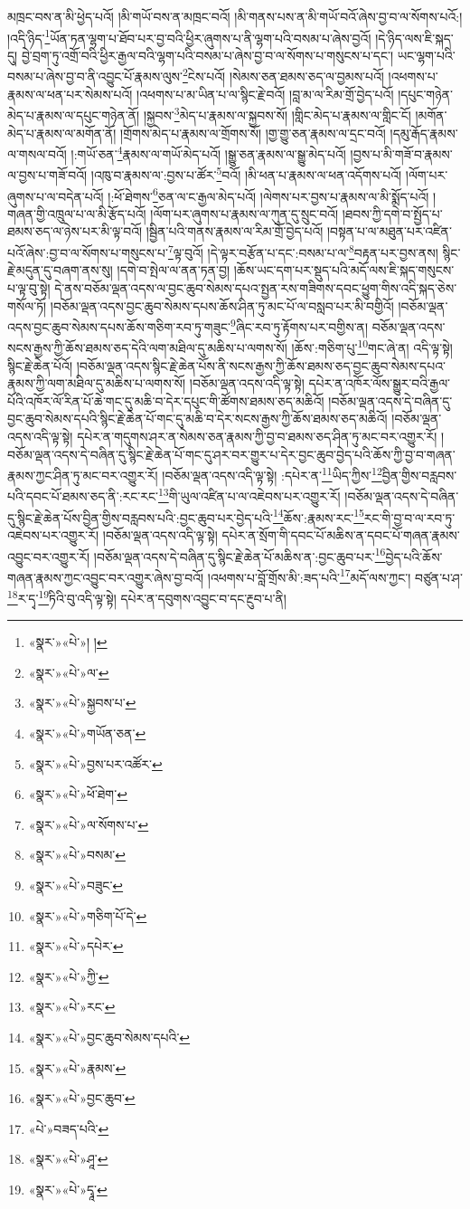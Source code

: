 མཁྲང་བས་ན་མི་ཕྱེད་པའོ། །མི་གཡོ་བས་ན་མཁྲང་བའོ། །མི་གནས་པས་ན་མི་གཡོ་བའོ་ཞེས་བྱ་བ་ལ་སོགས་པའོ:། །འདི་ཉིད་\footnote{«སྣར་»«པེ་»། །}ཡོན་ཏན་ལྷག་པ་ཐོབ་པར་བྱ་བའི་ཕྱིར་ཞུགས་པ་ནི་ལྷག་པའི་བསམ་པ་ཞེས་བྱའོ། །དེ་ཉིད་ལས་ཇི་སྐད་དུ། བྱེ་བྲག་ཏུ་འགྲོ་བའི་ཕྱིར་རྒྱལ་བའི་ལྷག་པའི་བསམ་པ་ཞེས་བྱ་བ་ལ་སོགས་པ་གསུངས་པ་དང་། ཡང་ལྷག་པའི་བསམ་པ་ཞེས་བྱ་བ་ནི་འབྱུང་པོ་རྣམས་ལུས་\footnote{«སྣར་»«པེ་»ལ་}ངེས་པའོ། །སེམས་ཅན་ཐམས་ཅད་ལ་བྱམས་པའོ། །འཕགས་པ་རྣམས་ལ་ཕན་པར་སེམས་པའོ། །འཕགས་པ་མ་ཡིན་པ་ལ་སྙིང་རྗེ་བའོ། །བླ་མ་ལ་རིམ་གྲོ་བྱེད་པའོ། །དཔུང་གཉེན་མེད་པ་རྣམས་ལ་དཔུང་གཉེན་ནོ། །སྐྱབས་\footnote{«སྣར་»«པེ་»སྐྱབས་པ་}མེད་པ་རྣམས་ལ་སྐྱབས་སོ། །གླིང་མེད་པ་རྣམས་ལ་གླིང་ངོ། །མགོན་མེད་པ་རྣམས་ལ་མགོན་ནོ། །གྲོགས་མེད་པ་རྣམས་ལ་གྲོགས་སོ། །གྱ་གྱུ་ཅན་རྣམས་ལ་དྲང་བའོ། །དམུ་རྒོད་རྣམས་ལ་གསལ་བའོ། །:གཡོ་ཅན་\footnote{«སྣར་»«པེ་»གཡོན་ཅན་}རྣམས་ལ་གཡོ་མེད་པའོ། །སྒྱུ་ཅན་རྣམས་ལ་སྒྱུ་མེད་པའོ། །བྱས་པ་མི་གཟོ་བ་རྣམས་ལ་བྱས་པ་གཟོ་བའོ། །འཁུ་བ་རྣམས་ལ་:བྱས་པ་ཚོར་\footnote{«སྣར་»«པེ་»བྱས་པར་འཚོར་}བའོ། །མི་ཕན་པ་རྣམས་ལ་ཕན་འདོགས་པའོ། །ལོག་པར་ཞུགས་པ་ལ་བདེན་པའོ། །:ཕོ་ཐེགས་\footnote{«སྣར་»«པེ་»ཕོ་ཐེག་}ཅན་ལ་ང་རྒྱལ་མེད་པའོ། །ལེགས་པར་བྱས་པ་རྣམས་ལ་མི་སྨོད་པའོ། །གཞན་གྱི་འཁྲུལ་པ་ལ་མི་རྩོད་པའོ། །ལོག་པར་ཞུགས་པ་རྣམས་ལ་ཀུན་དུ་སྲུང་བའོ། །ཐབས་ཀྱི་དགེ་བ་སྤྱོད་པ་ཐམས་ཅད་ལ་ཉེས་པར་མི་ལྟ་བའོ། །སྦྱིན་པའི་གནས་རྣམས་ལ་རིམ་གྲོ་བྱེད་པའོ། །བསྟན་པ་ལ་མཐུན་པར་འཛིན་པའོ་ཞེས་:བྱ་བ་ལ་སོགས་པ་གསུངས་པ་\footnote{«སྣར་»«པེ་»ལ་སོགས་པ་}ལྟ་བུའོ། །དེ་ལྟར་བརྩོན་པ་དང་:བསམ་པ་ལ་\footnote{«སྣར་»«པེ་»བསམ་}བརྟན་པར་བྱས་ནས། སྙིང་རྗེ་མདུན་དུ་བཞག་ནས་སུ། །དགེ་བ་སྤེལ་ལ་ནན་ཏན་བྱ། །ཆོས་ཡང་དག་པར་སྡུད་པའི་མདོ་ལས་ཇི་སྐད་གསུངས་པ་ལྟ་བུ་སྟེ། དེ་ནས་བཅོམ་ལྡན་འདས་ལ་བྱང་ཆུབ་སེམས་དཔའ་སྤྱན་རས་གཟིགས་དབང་ཕྱུག་གིས་འདི་སྐད་ཅེས་གསོལ་ཏོ། །བཅོམ་ལྡན་འདས་བྱང་ཆུབ་སེམས་དཔས་ཆོས་ཤིན་ཏུ་མང་པོ་ལ་བསླབ་པར་མི་བགྱིའོ། །བཅོམ་ལྡན་འདས་བྱང་ཆུབ་སེམས་དཔས་ཆོས་གཅིག་རབ་ཏུ་གཟུང་\footnote{«སྣར་»«པེ་»བཟུང་}ཞིང་རབ་ཏུ་རྟོགས་པར་བགྱིས་ན། བཅོམ་ལྡན་འདས་སངས་རྒྱས་ཀྱི་ཆོས་ཐམས་ཅད་དེའི་ལག་མཐིལ་དུ་མཆིས་པ་ལགས་སོ། །ཆོས་:གཅིག་པུ་\footnote{«སྣར་»«པེ་»གཅིག་པོ་དེ་}གང་ཞེ་ན། འདི་ལྟ་སྟེ། སྙིང་རྗེ་ཆེན་པོའོ། །བཅོམ་ལྡན་འདས་སྙིང་རྗེ་ཆེན་པོས་ནི་སངས་རྒྱས་ཀྱི་ཆོས་ཐམས་ཅད་བྱང་ཆུབ་སེམས་དཔའ་རྣམས་ཀྱི་ལག་མཐིལ་དུ་མཆིས་པ་ལགས་སོ། །བཅོམ་ལྡན་འདས་འདི་ལྟ་སྟེ། དཔེར་ན་འཁོར་ལོས་སྒྱུར་བའི་རྒྱལ་པོའི་འཁོར་ལོ་རིན་པོ་ཆེ་གང་དུ་མཆི་བ་དེར་དཔུང་གི་ཚོགས་ཐམས་ཅད་མཆིའོ། །བཅོམ་ལྡན་འདས་དེ་བཞིན་དུ་བྱང་ཆུབ་སེམས་དཔའི་སྙིང་རྗེ་ཆེན་པོ་གང་དུ་མཆི་བ་དེར་སངས་རྒྱས་ཀྱི་ཆོས་ཐམས་ཅད་མཆིའོ། །བཅོམ་ལྡན་འདས་འདི་ལྟ་སྟེ། དཔེར་ན་གདུགས་ཤར་ན་སེམས་ཅན་རྣམས་ཀྱི་བྱ་བ་ཐམས་ཅད་ཤིན་ཏུ་མང་བར་འགྱུར་རོ། །བཅོམ་ལྡན་འདས་དེ་བཞིན་དུ་སྙིང་རྗེ་ཆེན་པོ་གང་དུ་ཤར་བར་གྱུར་པ་དེར་བྱང་ཆུབ་བྱེད་པའི་ཆོས་ཀྱི་བྱ་བ་གཞན་རྣམས་ཀྱང་ཤིན་ཏུ་མང་བར་འགྱུར་རོ། །བཅོམ་ལྡན་འདས་འདི་ལྟ་སྟེ། :དཔེར་ན་\footnote{«སྣར་»«པེ་»དཔེར་}ཡིད་ཀྱིས་\footnote{«སྣར་»«པེ་»ཀྱི་}བྱིན་གྱིས་བརླབས་པའི་དབང་པོ་ཐམས་ཅད་ནི་:རང་རང་\footnote{«སྣར་»«པེ་»རང་}གི་ཡུལ་འཛིན་པ་ལ་འཇེབས་པར་འགྱུར་རོ། །བཅོམ་ལྡན་འདས་དེ་བཞིན་དུ་སྙིང་རྗེ་ཆེན་པོས་བྱིན་གྱིས་བརླབས་པའི་:བྱང་ཆུབ་པར་བྱེད་པའི་\footnote{«སྣར་»«པེ་»བྱང་ཆུབ་སེམས་དཔའི་}ཆོས་:རྣམས་རང་\footnote{«སྣར་»«པེ་»རྣམས་}རང་གི་བྱ་བ་ལ་རབ་ཏུ་འཇེབས་པར་འགྱུར་རོ། །བཅོམ་ལྡན་འདས་འདི་ལྟ་སྟེ། དཔེར་ན་སྲོག་གི་དབང་པོ་མཆིས་ན་དབང་པོ་གཞན་རྣམས་འབྱུང་བར་འགྱུར་རོ། །བཅོམ་ལྡན་འདས་དེ་བཞིན་དུ་སྙིང་རྗེ་ཆེན་པོ་མཆིས་ན་:བྱང་ཆུབ་པར་\footnote{«སྣར་»«པེ་»བྱང་ཆུབ་}བྱེད་པའི་ཆོས་གཞན་རྣམས་ཀྱང་འབྱུང་བར་འགྱུར་ཞེས་བྱ་བའོ། །འཕགས་པ་བློ་གྲོས་མི་:ཟད་པའི་\footnote{«པེ་»བཟད་པའི་}མདོ་ལས་ཀྱང་། བཙུན་པ་ཤ་\footnote{«སྣར་»«པེ་»ཤཱ་}ར་དྭ་\footnote{«སྣར་»«པེ་»དྭཱ་}ཏིའི་བུ་འདི་ལྟ་སྟེ། དཔེར་ན་དབུགས་འབྱུང་བ་དང་རྔུབ་པ་ནི། 